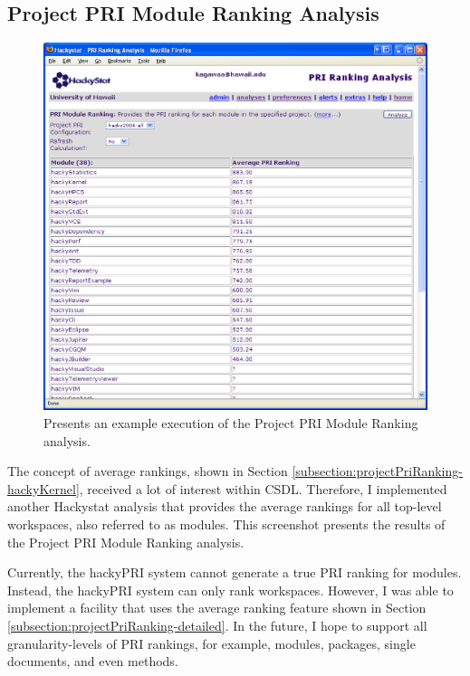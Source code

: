 \subsection{Project PRI Module Ranking Analysis}
\label{subsection:projectPriModuleRanking}
\begin{figure}[ht]
  \centering
  \includegraphics[width=1.00\textwidth]{figs/UserInterface/analysis-priModuleRanking-full.eps}
  \caption[Execution of the Project PRI Module Ranking analysis]{Presents an
    example execution of the Project PRI Module Ranking analysis.}  
  \label{fig:analysis-priModuleRanking-full}
\end{figure}
The concept of average rankings, shown in Section
\ref{subsection:projectPriRanking-hackyKernel}, received a lot of interest
within CSDL. Therefore, I implemented another Hackystat analysis that
provides the average rankings for all top-level workspaces, also referred
to as modules. This screenshot presents the results of the Project PRI
Module Ranking analysis.

Currently, the hackyPRI system cannot generate a true PRI ranking for
modules. Instead, the hackyPRI system can only rank workspaces. However, I
was able to implement a facility that uses the average ranking feature
shown in Section \ref{subsection:projectPriRanking-detailed}. In the
future, I hope to support all granularity-levels of PRI rankings, for
example, modules, packages, single documents, and even methods.

